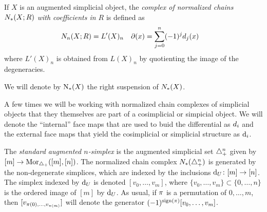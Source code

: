 If $X$ is an augmented simplicial object, the \emph{complex of normalized chains $\cadenas(X;R)$ with coefficients in $R$} is defined as
\begin{align*}
	\cadenas[n](X;R) &= L'(X)_n
	&
	\partial(x) &= \sum_{j=0}^{n} (-1)^jd_j(x)
\end{align*}
where $L'(X)_n$ is obtained from $L(X)_n$ by quotienting the image of the degeneracies.
\begin{notation}\label{notation:chains}
	We will denote by $\chains(X)$ the right suspension of $\cadenas(X)$.
\end{notation}

\begin{notation}
	A few times we will be working with normalized chain complexes of simplicial objects that they themselves are part of a cosimplicial or simpicial object. We will denote the ``internal'' face maps that are used to buid the differential as $\diff_i$ and the external face maps that yield the cosimplicial or simplicial structure as $\d_i$.
\end{notation}





The \emph{standard augmented $n$-simplex} is the augmented simplicial set $\simplex^n_+$ given by $[m]\to \mathrm{Mor}_{\asimplex}([m],[n])$. The normalized chain complex $\cadenas(\asimplex^n)$ is generated by the non-degenerate simplices, which are indexed by the inclusions $\d_U \colon  [m]\to [n]$. The simplex indexed by $\d_U$ is denoted $[v_0,\ldots,v_{m}]$, where $\{v_0,\ldots,v_{m}\}\subset \{0,\ldots,n\}$ is the ordered image of $[m]$ by $\d_U$. As usual, if $\perm$ is a permutation of $0,\ldots,m$, then $[v_{\perm(0),\ldots,v_{\perm(m)}}]$ will denote the generator $(-1)^{\sign{\perm}}[v_0,\ldots,v_m]$.

%

